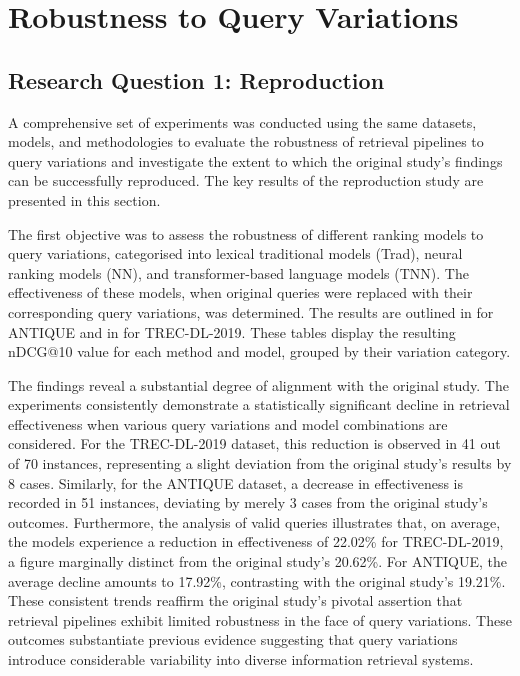 \section{Robustness to Query Variations}
\subsection{Research Question 1: Reproduction}
A comprehensive set of experiments was conducted using the same datasets, models, and methodologies to evaluate the robustness of retrieval pipelines to query variations and investigate the extent to which the original study's findings can be successfully reproduced. The key results of the reproduction study are presented in this section.

The first objective was to assess the robustness of different ranking models to query variations, categorised into lexical traditional models (Trad), neural ranking models (NN), and transformer-based language models (TNN). The effectiveness of these models, when original queries were replaced with their corresponding query variations, was determined. The results are outlined in  for ANTIQUE and in  for TREC-DL-2019. These tables display the resulting nDCG@10 value for each method and model, grouped by their variation category.




The findings reveal a substantial degree of alignment with the original study. The experiments consistently demonstrate a statistically significant decline in retrieval effectiveness when various query variations and model combinations are considered. For the TREC-DL-2019 dataset, this reduction is observed in 41 out of 70 instances, representing a slight deviation from the original study's results by 8 cases. Similarly, for the ANTIQUE dataset, a decrease in effectiveness is recorded in 51 instances, deviating by merely 3 cases from the original study's outcomes. Furthermore, the analysis of valid queries illustrates that, on average, the models experience a reduction in effectiveness of 22.02\% for TREC-DL-2019, a figure marginally distinct from the original study's 20.62\%. For ANTIQUE, the average decline amounts to 17.92\%, contrasting with the original study's 19.21\%. These consistent trends reaffirm the original study's pivotal assertion that retrieval pipelines exhibit limited robustness in the face of query variations. These outcomes substantiate previous evidence suggesting that query variations introduce considerable variability into diverse information retrieval systems.

